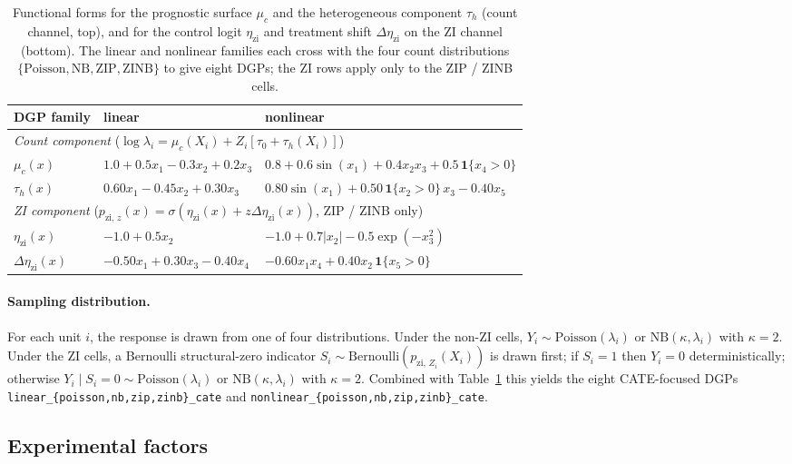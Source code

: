 \documentclass[11pt]{article}
\theoremstyle{plain}
\theoremstyle{definition}
\theoremstyle{remark}
\newcommand{\Poi}{\mathrm{Poisson}}
\newcommand{\NB}{\mathrm{NB}}
\newcommand{\Ber}{\mathrm{Bernoulli}}
\newcommand{\ind}{\mathbf{1}}
\newcommand{\pzi}[1][z]{p_{\mathrm{zi},\,#1}}
\newcommand{\etazi}{\eta_{\mathrm{zi}}}
\newcommand{\Detazi}{\Delta\etazi}
\begin{document}
\begin{table}[t]
\centering
\caption{Functional forms for the prognostic surface $\mu_c$ and the
heterogeneous component $\tau_h$ (count channel, top), and for the
control logit $\etazi$ and treatment shift $\Detazi$ on the ZI
channel (bottom). The linear and nonlinear families each cross with
the four count distributions $\{\Poi, \NB, \mathrm{ZIP},
\mathrm{ZINB}\}$ to give eight DGPs; the ZI rows apply only to the
ZIP / ZINB cells.}
\label{tab:method-dgp}
\begin{tabular}{lll}
\toprule
DGP family & linear & nonlinear \\
\midrule
\multicolumn{3}{l}{\emph{Count component} ($\log\lambda_i = \mu_c(X_i) + Z_i[\tau_0 + \tau_h(X_i)]$)} \\
$\mu_c(x)$ &
  $1.0 + 0.5 x_1 - 0.3 x_2 + 0.2 x_3$ &
  $0.8 + 0.6 \sin(x_1) + 0.4 x_2 x_3 + 0.5\,\ind\{x_4 > 0\}$ \\
$\tau_h(x)$ &
  $0.60 x_1 - 0.45 x_2 + 0.30 x_3$ &
  $0.80 \sin(x_1) + 0.50\,\ind\{x_2 > 0\}\, x_3 - 0.40 x_5$ \\
\midrule
\multicolumn{3}{l}{\emph{ZI component} ($\pzi(x) = \sigma(\etazi(x) + z \Detazi(x))$, ZIP / ZINB only)} \\
$\etazi(x)$ &
  $-1.0 + 0.5 x_2$ &
  $-1.0 + 0.7 \lvert x_2 \rvert - 0.5 \exp(-x_3^{2})$ \\
$\Detazi(x)$ &
  $-0.50 x_1 + 0.30 x_3 - 0.40 x_4$ &
  $-0.60 x_1 x_4 + 0.40 x_2\,\ind\{x_5 > 0\}$ \\
\bottomrule
\end{tabular}
\end{table}

\paragraph{Sampling distribution.}
For each unit $i$, the response is drawn from one of four
distributions. Under the non-ZI cells, $Y_i \sim \Poi(\lambda_i)$ or
$\NB(\kappa, \lambda_i)$ with $\kappa = 2$. Under the ZI cells, a
Bernoulli structural-zero indicator $S_i \sim \Ber(\pzi[Z_i](X_i))$
is drawn first; if $S_i = 1$ then $Y_i = 0$ deterministically;
otherwise
$Y_i \mid S_i = 0 \sim \Poi(\lambda_i)$ or $\NB(\kappa, \lambda_i)$
with $\kappa = 2$. Combined with Table~\ref{tab:method-dgp} this
yields the eight CATE-focused DGPs
\verb|linear_{poisson,nb,zip,zinb}_cate| and
\verb|nonlinear_{poisson,nb,zip,zinb}_cate|.

\subsection{Experimental factors}\label{sec:method-factors}
\end{document}

